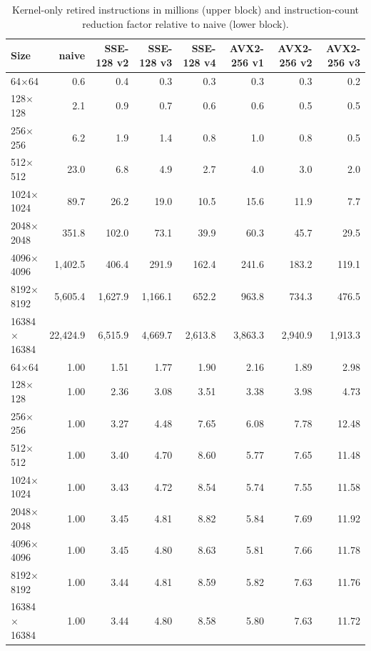 \begin{table}[htbp]
\centering
\small
\caption{Kernel-only retired instructions in millions (upper block) and instruction-count reduction factor relative to naive (lower block).}
\label{tab:simd-instr}
\begin{tabular}{lrrrrrrr}
\toprule
Size & naive & SSE-128 v2 & SSE-128 v3 & SSE-128 v4 & AVX2-256 v1 & AVX2-256 v2 & AVX2-256 v3 \\
\midrule
64$\times$64 & 0.6 & 0.4 & 0.3 & 0.3 & 0.3 & 0.3 & 0.2 \\
128$\times$128 & 2.1 & 0.9 & 0.7 & 0.6 & 0.6 & 0.5 & 0.5 \\
256$\times$256 & 6.2 & 1.9 & 1.4 & 0.8 & 1.0 & 0.8 & 0.5 \\
512$\times$512 & 23.0 & 6.8 & 4.9 & 2.7 & 4.0 & 3.0 & 2.0 \\
1024$\times$1024 & 89.7 & 26.2 & 19.0 & 10.5 & 15.6 & 11.9 & 7.7 \\
2048$\times$2048 & 351.8 & 102.0 & 73.1 & 39.9 & 60.3 & 45.7 & 29.5 \\
4096$\times$4096 & 1,402.5 & 406.4 & 291.9 & 162.4 & 241.6 & 183.2 & 119.1 \\
8192$\times$8192 & 5,605.4 & 1,627.9 & 1,166.1 & 652.2 & 963.8 & 734.3 & 476.5 \\
16384$\times$16384 & 22,424.9 & 6,515.9 & 4,669.7 & 2,613.8 & 3,863.3 & 2,940.9 & 1,913.3 \\
\midrule
64$\times$64 & 1.00 & 1.51 & 1.77 & 1.90 & 2.16 & 1.89 & 2.98 \\
128$\times$128 & 1.00 & 2.36 & 3.08 & 3.51 & 3.38 & 3.98 & 4.73 \\
256$\times$256 & 1.00 & 3.27 & 4.48 & 7.65 & 6.08 & 7.78 & 12.48 \\
512$\times$512 & 1.00 & 3.40 & 4.70 & 8.60 & 5.77 & 7.65 & 11.48 \\
1024$\times$1024 & 1.00 & 3.43 & 4.72 & 8.54 & 5.74 & 7.55 & 11.58 \\
2048$\times$2048 & 1.00 & 3.45 & 4.81 & 8.82 & 5.84 & 7.69 & 11.92 \\
4096$\times$4096 & 1.00 & 3.45 & 4.80 & 8.63 & 5.81 & 7.66 & 11.78 \\
8192$\times$8192 & 1.00 & 3.44 & 4.81 & 8.59 & 5.82 & 7.63 & 11.76 \\
16384$\times$16384 & 1.00 & 3.44 & 4.80 & 8.58 & 5.80 & 7.63 & 11.72 \\
\bottomrule
\end{tabular}
\end{table}
